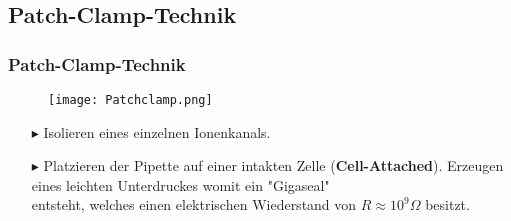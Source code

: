 \documentclass[ngerman]{beamer}
\begin{document}

 
 


\subsection{Patch-Clamp-Technik}
\begin{frame}\frametitle{ Patch-Clamp-Technik }
\begin{multicols}{2}
\begin{figure}[h]
	\center
	\texttt{[image: Patchclamp.png]}
\end{figure}
\begin{itemize}
	\item[$\blacktriangleright$]  Isolieren eines einzelnen Ionenkanals.
\end{itemize}

\columnbreak
\begin{itemize}
	\item[$\blacktriangleright$] Platzieren der Pipette auf einer intakten Zelle (\textbf{Cell-Attached}). Erzeugen eines leichten Unterdruckes womit ein "Gigaseal"\\entsteht, welches einen elektrischen Wiederstand von $ R \approx 10^9 \Omega $ besitzt. 
\end{itemize}



\end{multicols}


\end{frame}
%
\end{document}
